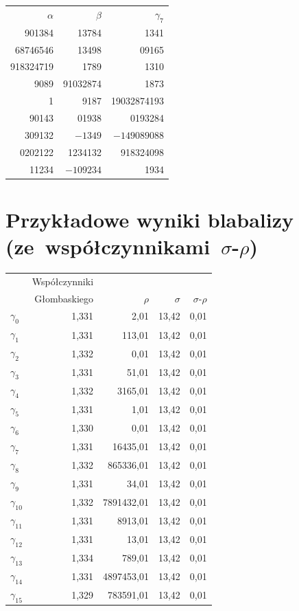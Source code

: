 \begin{center}
  \begin{tabular}{rrr}
    $\alpha$ & $\beta$ & $\gamma_7$ \\
    901384 & 13784 & 1341\\
    68746546 & 13498& 09165\\
    918324719& 1789 & 1310 \\
    9089 & 91032874& 1873 \\
    1 & 9187 & 19032874193 \\
    90143 & 01938 & 0193284 \\
    309132 & $-1349$ & $-149089088$ \\
    0202122 & 1234132 & 918324098 \\
    11234 & $-109234$ & 1934 \\
  \end{tabular}
\end{center}

\chapter{Przykładowe wyniki blabalizy
    (ze~współczynnikami~$\sigma$-$\rho$)}

\begin{center}
  \begin{tabular}{lrrrr}
    & Współczynniki \\
    & Głombaskiego & $\rho$ & $\sigma$ & $\sigma$-$\rho$\\
    $\gamma_{0}$ & 1,331 & 2,01 & 13,42 & 0,01 \\
    $\gamma_{1}$ & 1,331 & 113,01 & 13,42 & 0,01 \\
    $\gamma_{2}$ & 1,332 & 0,01 & 13,42 & 0,01 \\
    $\gamma_{3}$ & 1,331 & 51,01 & 13,42 & 0,01 \\
    $\gamma_{4}$ & 1,332 & 3165,01 & 13,42 & 0,01 \\
    $\gamma_{5}$ & 1,331 & 1,01 & 13,42 & 0,01 \\
    $\gamma_{6}$ & 1,330 & 0,01 & 13,42 & 0,01 \\
    $\gamma_{7}$ & 1,331 & 16435,01 & 13,42 & 0,01 \\
    $\gamma_{8}$ & 1,332 & 865336,01 & 13,42 & 0,01 \\
    $\gamma_{9}$ & 1,331 & 34,01 & 13,42 & 0,01 \\
    $\gamma_{10}$ & 1,332 & 7891432,01 & 13,42 & 0,01 \\
    $\gamma_{11}$ & 1,331 & 8913,01 & 13,42 & 0,01 \\
    $\gamma_{12}$ & 1,331 & 13,01 & 13,42 & 0,01 \\
    $\gamma_{13}$ & 1,334 & 789,01 & 13,42 & 0,01 \\
    $\gamma_{14}$ & 1,331 & 4897453,01 & 13,42 & 0,01 \\
    $\gamma_{15}$ & 1,329 & 783591,01 & 13,42 & 0,01 \\
  \end{tabular}
\end{center}

